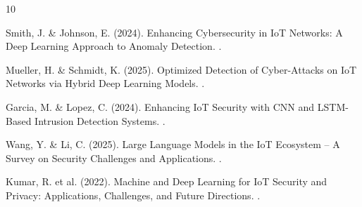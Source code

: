 \documentclass[12pt,a4paper]{article}
\begin{document}

\begin{thebibliography}{10}

Smith, J. \& Johnson, E. (2024).
\newblock Enhancing Cybersecurity in IoT Networks: A Deep Learning Approach to Anomaly Detection.
.

Mueller, H. \& Schmidt, K. (2025).
\newblock Optimized Detection of Cyber-Attacks on IoT Networks via Hybrid Deep Learning Models.
.

Garcia, M. \& Lopez, C. (2024).
\newblock Enhancing IoT Security with CNN and LSTM-Based Intrusion Detection Systems.
.

Wang, Y. \& Li, C. (2025).
\newblock Large Language Models in the IoT Ecosystem -- A Survey on Security Challenges and Applications.
.

Kumar, R. et al. (2022).
\newblock Machine and Deep Learning for IoT Security and Privacy: Applications, Challenges, and Future Directions.
.

\end{thebibliography}
\end{document}
